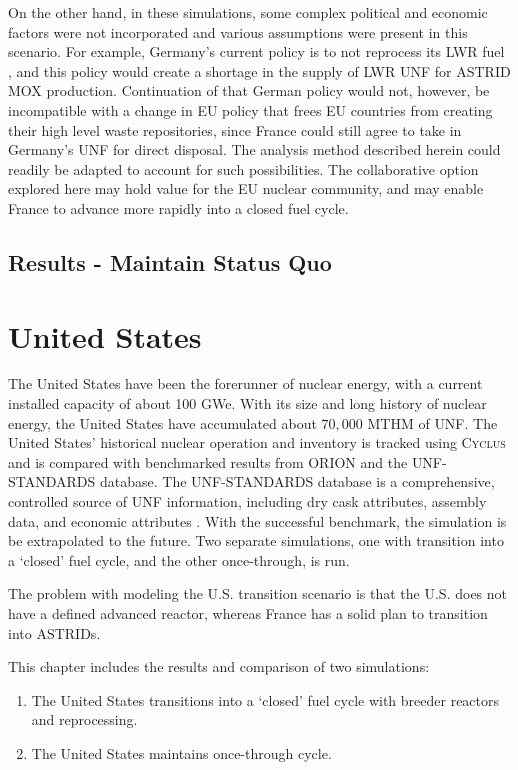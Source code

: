 \documentclass{article}
\newcommand{\Cyclus}{\textsc{Cyclus}\xspace}%
\begin{document}
On the other hand, in these simulations, some complex political and economic factors were not incorporated and various assumptions were present in this scenario. For
example, Germany's current policy is to not reprocess its \gls{LWR} fuel
\cite{topfer_germanys_2011}, and this policy would create a shortage
in the supply of \gls{LWR} \gls{UNF} for \gls{ASTRID} \gls{MOX} production.
Continuation of that German policy would not, however, be incompatible
with a change in \gls{EU} policy that frees \gls{EU} countries from
creating their high level waste repositories, since France could still
agree to take in Germany's \gls{UNF} for direct disposal. The analysis
method described herein could readily be adapted to account for such possibilities. 
The collaborative option explored here may hold value for the \gls{EU} nuclear community,
and may enable France to advance more rapidly into a closed fuel cycle. 
\FloatBarrier


\subsection{Results - Maintain Status Quo}





\section{United States}
The United States have been the forerunner of nuclear energy, with a current
installed capacity of about 100 GWe. With its size and long history of nuclear
energy, the United States have accumulated about $70,000$ \gls{MTHM} of \gls{UNF}.
The United States' historical nuclear operation and inventory is tracked using
\Cyclus and is compared with benchmarked results from \gls{ORION} and the
\gls{UNF-STANDARDS} database. The \gls{UNF-STANDARDS} database is a comprehensive,
controlled source of \gls{UNF} information, including dry cask attributes, assembly
data, and economic attributes \cite{peterson_unf_2017}. With the successful benchmark,
the simulation is be extrapolated to the future. Two separate simulations, one with
transition into a `closed' fuel cycle, and the other once-through, is run.

The problem with modeling the U.S. transition scenario is that the U.S. does not have
a defined advanced reactor, whereas France has a solid plan to transition into \glspl{ASTRID}.

This chapter includes the results and comparison of two simulations:
\begin{enumerate}
    \item The United States transitions into a `closed' fuel cycle with breeder reactors and reprocessing.
    \item The United States maintains once-through cycle.
\end{enumerate}
\end{document}
